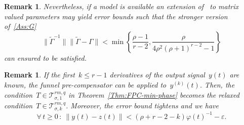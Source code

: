 \documentclass[ envcountsect, envcountsame]{svjour3}
\newtheorem{Remark}[Theorem]{Remark}
\newcommand{\cT}{\mathcal{T}}
\newcommand{\vp}{\varphi}
\newcommand{\ve}{\varepsilon}
\begin{document}
\begin{Remark}
Nevertheless, if a model is available an extension of~\cite[Prop. 2.1]{KaltNguy21} to matrix valued parameters may yield error bounds such that the stronger version of~\ref{Ass:G} 
\begin{equation*}
\|\tilde \Gamma^{-1}\| \|\tilde \Gamma - \Gamma\| < \min \left\{\frac{\rho -1}{r-2}, \frac{ \rho }{4\rho^2(\rho+1)^{r-2} - 1} \right\}
\end{equation*}
can ensured to be satisfied.
\end{Remark}

\begin{Remark} \label{Rem:k-derivatives-known}
If the first~$k \le r-1$ derivatives of the output signal~$y(t)$ are known, the funnel pre-compensator can be applied to~$y^{(k)}(t)$. 
Then, the condition~$T \in \cT^{{rm},q}_{\sigma,1}$ in Theorem~\ref{Thm:FPC-min-phase} becomes the relaxed condition~$T \in \cT^{{rm},q}_{\sigma,k}$.
Moreover, the error bound tightens and we have
\begin{equation*}
\forall\, t\ge0\, : \ \| y(t) - z(t) \| < (\rho + r-2-k)\vp(t)^{-1} - \ve.
 \end{equation*} 
\end{Remark}
\end{document}
